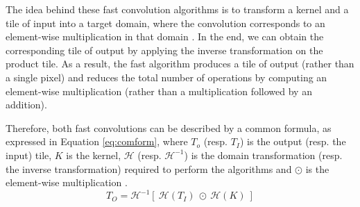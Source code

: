 The idea behind these fast convolution algorithms is to transform a kernel and a tile of input into a target domain, where the convolution corresponds to an element-wise multiplication in that domain \cite{abdelouahab_accelerating_2018}. In the end, we can obtain the corresponding tile of output by applying the inverse transformation on the product tile. As a result, the fast algorithm produces a tile of output (rather than a single pixel) and reduces the total number of operations by computing an element-wise multiplication (rather than a multiplication followed by an addition).

Therefore, both fast convolutions can be described by a common formula, as expressed in Equation \eqref{eq:comform}, where $T_o$ (resp. $T_I$) is the output (resp. the input) tile, $K$ is the kernel, $\mathcal{H}$ (resp. $\mathcal{H}^{-1}$) is the domain transformation (resp. the inverse transformation) required to perform the algorithms and $\odot$ is the element-wise multiplication \cite{liang_evaluating_2020}.
%
\begin{equation}
    T_O = \mathcal{H}^{-1} [ \ \mathcal{H}(T_I) \ \odot \ \mathcal{H}(K) \ ]
    \label{eq:comform}
\end{equation}
%
